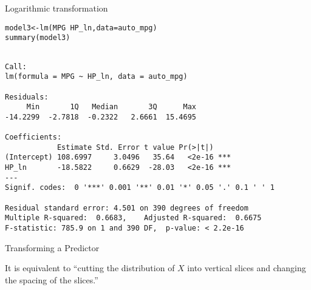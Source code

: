 \documentclass{beamer}\usepackage[]{graphicx}\usepackage[]{color}
\makeatletter
\newcommand{\hlstr}[1]{\textcolor[rgb]{1,0.894,0.71}{#1}}%
\newcommand{\hlopt}[1]{\textcolor[rgb]{1,0.894,0.769}{#1}}%
\newcommand{\hlstd}[1]{\textcolor[rgb]{1,0.894,0.769}{#1}}%
\newcommand{\hlkwb}[1]{\textcolor[rgb]{0.804,0.776,0.451}{#1}}%
\newcommand{\hlkwc}[1]{\textcolor[rgb]{0.78,0.941,0.545}{#1}}%
\newcommand{\hlkwd}[1]{\textcolor[rgb]{1,0.78,0.769}{#1}}%
\newenvironment{kframe}{%
 \def\at@end@of@kframe{}%
 \ifinner\ifhmode%
  \def\at@end@of@kframe{\end{minipage}}%
  \begin{minipage}{\columnwidth}%
 \fi\fi%
 \def\FrameCommand##1{\hskip\@totalleftmargin \hskip-\fboxsep
 \colorbox{shadecolor}{##1}\hskip-\fboxsep
     \hskip-\linewidth \hskip-\@totalleftmargin \hskip\columnwidth}%
 \MakeFramed {\advance\hsize-\width
   \@totalleftmargin\z@ \linewidth\hsize
   \@setminipage}}%
 {\par\unskip\endMakeFramed%
 \at@end@of@kframe}
\newenvironment{knitrout}{}{} %
\makeatother
\begin{document}
\begin{darkframes}
\begin{frame}[fragile]{Logarithmic transformation}
\begin{knitrout}
\end{knitrout}
    \end{frame}
    

    \begin{frame}[fragile]
      \fontsize{9}{9}\selectfont
\begin{knitrout}
\begin{kframe}
\begin{alltt}
  \hlstd{model3}\hlkwb{<-}\hlkwd{lm}\hlstd{(MPG} \hlopt{~} \hlstd{HP_ln,} \hlkwc{data}\hlstd{=auto_mpg)}
  \hlkwd{summary}\hlstd{(model3)}
\end{alltt}
\begin{verbatim}

Call:
lm(formula = MPG ~ HP_ln, data = auto_mpg)

Residuals:
     Min       1Q   Median       3Q      Max 
-14.2299  -2.7818  -0.2322   2.6661  15.4695 

Coefficients:
            Estimate Std. Error t value Pr(>|t|)    
(Intercept) 108.6997     3.0496   35.64   <2e-16 ***
HP_ln       -18.5822     0.6629  -28.03   <2e-16 ***
---
Signif. codes:  0 '***' 0.001 '**' 0.01 '*' 0.05 '.' 0.1 ' ' 1

Residual standard error: 4.501 on 390 degrees of freedom
Multiple R-squared:  0.6683,	Adjusted R-squared:  0.6675 
F-statistic: 785.9 on 1 and 390 DF,  p-value: < 2.2e-16
\end{verbatim}
\end{kframe}
\end{knitrout}
    \end{frame}
    
    


    \begin{frame}[fragile]{Transforming a Predictor}
      \begin{center}
        It is equivalent to ``cutting the distribution of $X$ into vertical slices and changing the spacing of the slices.'' \bigskip \pause
        

\end{center}
\end{frame}
\end{darkframes}
\end{document}

